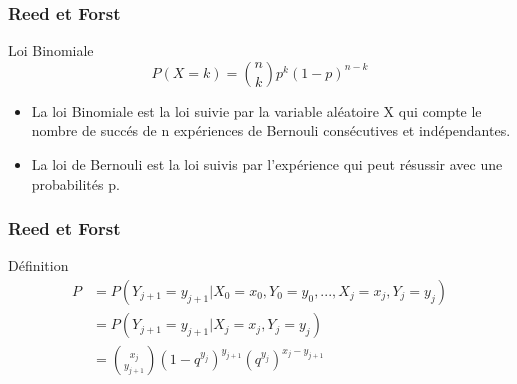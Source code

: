 \begin{frame}
    \frametitle{Reed et Forst}

    \begin{alertblock}{Loi Binomiale}
        $$ P(X = k) = \binom{n}{k}p^k(1 - p)^{n-k} $$
    \end{alertblock}

    \begin{itemize}
        \item La loi Binomiale est la loi suivie par la variable aléatoire X qui compte le nombre de succés de n expériences de Bernouli consécutives et indépendantes.
        \item La loi de Bernouli est la loi suivis par l'expérience qui peut résussir avec une probabilités p.
    \end{itemize}
\end{frame}

\begin{frame}
    \frametitle{Reed et Forst}

    \begin{alertblock}{Définition}
        \begin{align}
            P &= P(Y_{j+1} = y_{j+1} | X_0 = x_0, Y_0 = y_0, ..., X_j = x_j, Y_j = y_j) \\
              &= P(Y_{j+1} = y_{j+1} | X_j = x_j, Y_j = y_j) \\
              &= \binom{x_j}{y_{j+1}}(1 - q^{y_j})^{y_{j+1}}(q^{y_j})^{x_j - y_{j+1}}
        \end{align}
    \end{alertblock}
\end{frame}
